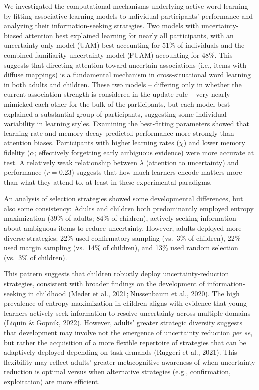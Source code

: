 \documentclass[10pt, letterpaper]{article}
\begin{document}
We investigated the computational mechanisms underlying active word
learning by fitting associative learning models to individual
participants' performance and analyzing their information-seeking
strategies. Two models with uncertainty-biased attention best explained
learning for nearly all participants, with an uncertainty-only model
(UAM) best accounting for 51\% of individuals and the combined
familiarity-uncertainty model (FUAM) accounting for 48\%. This suggests
that directing attention toward uncertain associations (i.e., items with
diffuse mappings) is a fundamental mechanism in cross-situational word
learning in both adults and children. These two models -- differing only
in whether the current association strength is considered in the update
rule -- very nearly mimicked each other for the bulk of the
participants, but each model best explained a substantial group of
participants, suggesting some individual variability in learning styles.
Examining the best-fitting parameters showed that learning rate and
memory decay predicted performance more strongly than attention biases.
Participants with higher learning rates (\(\chi\)) and lower memory
fidelity (\(\alpha\); effectively forgetting early ambiguous evidence)
were more accurate at test. A relatively weak relationship between
\(\lambda\) (attention to uncertainty) and performance (\(r = 0.23\))
suggests that how much learners encode matters more than what they
attend to, at least in these experimental paradigms.

An analysis of selection strategies showed some developmental
differences, but also some consistency: Adults and children both
predominantly employed entropy maximization (39\% of adults; 84\% of
children), actively seeking information about ambiguous items to reduce
uncertainty. However, adults deployed more diverse strategies: 22\% used
confirmatory sampling (vs.~3\% of children), 22\% used margin sampling
(vs.~14\% of children), and 13\% used random selection (vs.~3\% of
children).

This pattern suggests that children robustly deploy
uncertainty-reduction strategies, consistent with broader findings on
the development of information-seeking in childhood (Meder et al., 2021;
Nussenbaum et al., 2020). The high prevalence of entropy maximization in
children aligns with evidence that young learners actively seek
information to resolve uncertainty across multiple domains (Liquin \&
Gopnik, 2022). However, adults' greater strategic diversity suggests
that development may involve not the emergence of uncertainty reduction
\emph{per se}, but rather the acquisition of a more flexible repertoire
of strategies that can be adaptively deployed depending on task demands
(Ruggeri et al., 2021). This flexibility may reflect adults' greater
metacognitive awareness of when uncertainty reduction is optimal versus
when alternative strategies (e.g., confirmation, exploitation) are more
efficient.
\end{document}
